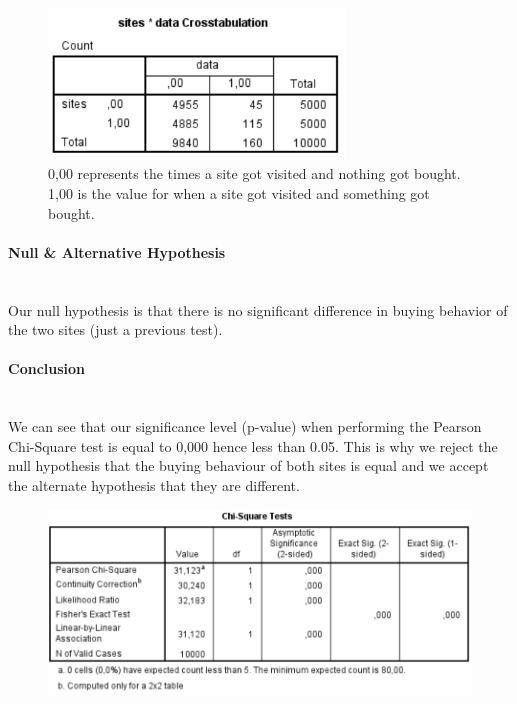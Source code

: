\documentclass[14]{article}
\begin{document}
\begin{figure}[!htb]
	\includegraphics[width=0.7\textwidth]{img/question2/Question2_b.PNG}
	\captionsetup{width=0.8\textwidth}
	\centering 
	\caption{0,00 represents the times a site got visited and nothing got bought. 1,00 is the value for when a site got visited and something got bought.  } 
\end{figure}

\paragraph{Null \& Alternative Hypothesis}\mbox{}\\
Our null hypothesis is that there is no significant difference in buying behavior of the two sites (just a previous test).

\paragraph{Conclusion}\mbox{}\\
We can see that our significance level (p-value) when performing the Pearson Chi-Square test is equal to 0,000 hence less than 0.05. This is why we reject the null hypothesis that the buying behaviour of both sites is equal and we accept the alternate hypothesis that they are different.

\begin{figure}[!htb]
	\includegraphics[width=1.0\textwidth]{img/question2/Question2_b_chi.PNG}
	\captionsetup{width=1.0\textwidth}
	\centering 
\end{figure}
\end{document}
